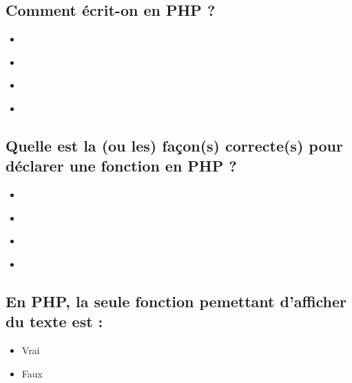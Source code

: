 \documentclass[11pt,a4paper]{article}
\begin{document}
\subsection{Comment écrit-on  en PHP ?}

\begin{itemize}
\item[\CaseCoche]  \\  %
\item[\CaseCoche]  \\
\item[\CaseCoche]  \\  %
\item[\CaseCoche]  \\
\end{itemize}


\subsection{Quelle est la (ou les) façon(s) correcte(s) pour déclarer une fonction  en PHP ?}

\begin{itemize}
\item[\CaseCoche]  \\
\item[\CaseCoche]  \\  %
\item[\CaseCoche]  \\
\item[\CaseCoche]  \\
\end{itemize}


\subsection{En PHP, la seule fonction pemettant d'afficher du texte est  :}

\begin{itemize}
\item[\CaseCoche] Vrai \\
\item[\CaseCoche] Faux \\  %
\end{itemize}
\end{document}
